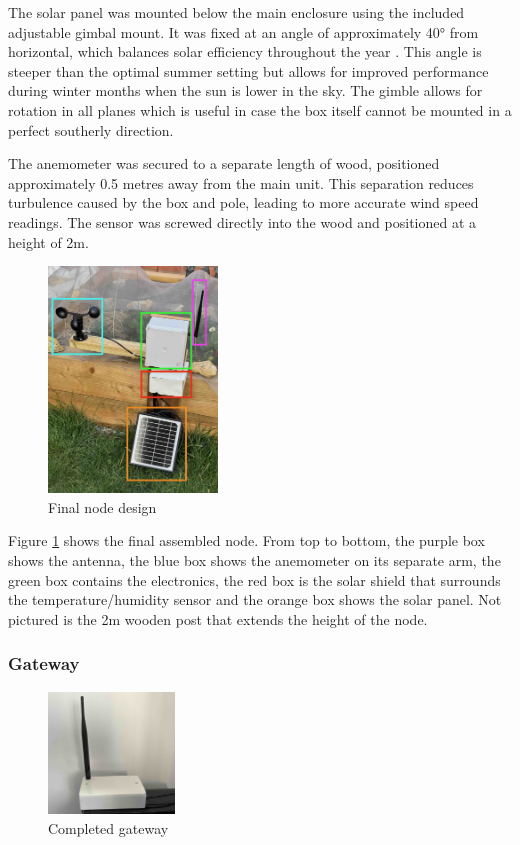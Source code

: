 The solar panel was mounted below the main enclosure using the included
adjustable gimbal mount. It was fixed at an angle of approximately 40° from
horizontal, which balances solar efficiency throughout the year
\cite{cathcart_best-solar-panel_2025}. This angle is steeper than the optimal
summer setting but allows for improved performance during winter months when the
sun is lower in the sky. The gimble allows for rotation in all planes which is
useful in case the box itself cannot be mounted in a perfect southerly
direction.

The anemometer was secured to a separate length of wood, positioned
approximately 0.5 metres away from the main unit. This separation reduces
turbulence caused by the box and pole, leading to more accurate wind speed
readings. The sensor was screwed directly into the wood and positioned at a
height of 2m.


\begin{figure}[H]
    \centering
    \includegraphics[width=0.4\textwidth]{contents/part-2/fig2/annotated-node.jpg}
    \caption{Final node design}
    \label{fig:assembled-node}
\end{figure}

Figure \ref{fig:assembled-node} shows the final assembled node. From top to
bottom, the purple box shows the antenna, the blue box shows the anemometer on
its separate arm, the green box contains the electronics, the red box is the
solar shield that surrounds the temperature/humidity sensor and the orange box
shows the solar panel. Not pictured is the 2m wooden post that extends the
height of the node.

\subsubsection{Gateway}

\begin{figure}[H]
    \centering
    \includegraphics[width=0.3\textwidth]{contents/part-2/fig2/gateway.jpeg}
    \caption{Completed gateway}
    \label{fig:gateway-final}
\end{figure}

